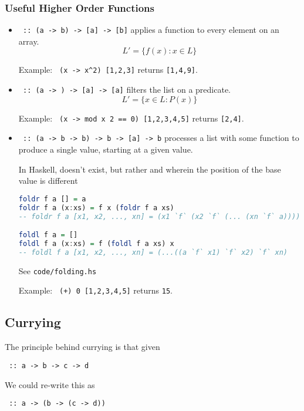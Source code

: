 \subsubsection{Useful Higher Order Functions}
\begin{itemize}
  \item \texttt{ :: (a -> b) -> [a] -> [b]} applies a function to every element on an array.
  \[L' = \{f(x) : x \in L\}\]
  
  Example: \texttt{ (x -> x\string^2) [1,2,3]} returns \texttt{[1,4,9]}.
  \item \texttt{ :: (a -> ) -> [a] -> [a]} filters the list on a predicate.
  \[L' = \{x \in L : P(x)\}\]
  
  Example: \texttt{ (x -> mod x 2 == 0) [1,2,3,4,5]} returns \texttt{[2,4]}.
  \item \texttt{ :: (a -> b -> b) -> b -> [a] -> b} processes a list with some function to produce a single value, starting at a given value.
  
  In Haskell, \texttt{} doesn't exist, but rather \texttt{} and \texttt{} wherein the position of the base value is different

  \begin{lstlisting}[language=haskell]
foldr f a [] = a
foldr f a (x:xs) = f x (foldr f a xs)
-- foldr f a [x1, x2, ..., xn] = (x1 `f` (x2 `f` (... (xn `f` a))))

foldl f a = []
foldl f a (x:xs) = f (foldl f a xs) x
-- foldl f a [x1, x2, ..., xn] = (...((a `f` x1) `f` x2) `f` xn)
  \end{lstlisting}

  See \texttt{code/folding.hs}

  Example: \texttt{ (+) 0 [1,2,3,4,5]} returns \texttt{15}.
\end{itemize}

\subsection{Currying}
The principle behind currying is that given
\begin{center}
  \texttt{ :: a -> b -> c -> d}
\end{center}
We could re-write this as
\begin{center}
  \texttt{ :: a -> (b -> (c -> d))}
\end{center}

